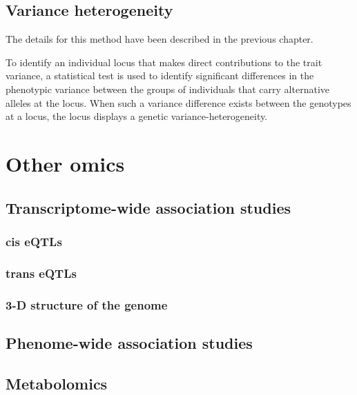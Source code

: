 \documentclass[]{book}
\theoremstyle{definition}
\theoremstyle{definition}
\theoremstyle{definition}
\theoremstyle{remark}
\begin{document}
\section{Variance heterogeneity}\label{variance-heterogeneity-1}

The details for this method have been described in the previous chapter.

To identify an individual locus that makes direct contributions to the
trait variance, a statistical test is used to identify significant
differences in the phenotypic variance between the groups of individuals
that carry alternative alleles at the locus. When such a variance
difference exists between the genotypes at a locus, the locus displays a
genetic variance-heterogeneity.

\chapter{Other omics}\label{other-omics}

\section{Transcriptome-wide association
studies}\label{transcriptome-wide-association-studies}

\subsection{cis eQTLs}\label{cis-eqtls}

\subsection{trans eQTLs}\label{trans-eqtls}

\subsection{3-D structure of the
genome}\label{d-structure-of-the-genome}

\section{Phenome-wide association
studies}\label{phenome-wide-association-studies}

\section{Metabolomics}\label{metabolomics}
\end{document}
